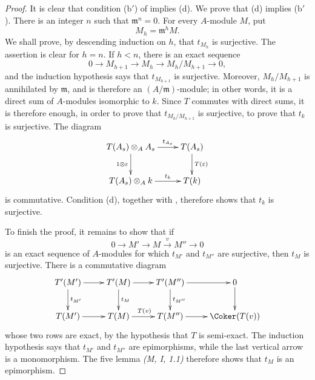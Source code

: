 \begin{proof}
It is clear that condition ($\mathrm{b}'$) of
 implies (d).  We prove that (d) implies
($\mathrm{b}'$).  There is an integer $n$ such that
$\mathfrak m^n=0$.  For every $A$-module $M$, put
\[
  M_h=\mathfrak m^hM.
\]
We shall prove, by descending induction on $h$, that $t_{M_h}$
is surjective.  The assertion is clear for $h=n$.  If $h<n$,
there is an exact sequence
\[
  0\longrightarrow M_{h+1}
  \longrightarrow M_h
  \longrightarrow M_h/M_{h+1}
  \longrightarrow0,
\]
and the induction hypothesis says that $t_{M_{h+1}}$ is
surjective.  Moreover, $M_h/M_{h+1}$ is annihilated by
$\mathfrak m$, and is therefore an $(A/\mathfrak m)$-module;
in other words, it is a direct sum of $A$-modules isomorphic to
$k$.  Since $T$ commutes with direct sums, it is therefore
enough, in order to prove that $t_{M_h/M_{h+1}}$ is surjective,
to prove that $t_k$ is surjective.  The diagram
\[
\xymatrix{
  T(A_s)\otimes_A A_s
    \ar[r]^-{t_{A_s}}\ar[d]_{1\otimes\varepsilon}
  & T(A_s)\ar[d]^{T(\varepsilon)}
  \\
  T(A_s)\otimes_A k
    \ar[r]^-{t_k}
  & T(k)
}
\]
is commutative.  Condition (d), together with
, therefore shows that $t_k$ is surjective.

To finish the proof, it remains to show that if
\[
  0\longrightarrow M'
  \longrightarrow M
  \xrightarrow{v}M''
  \longrightarrow0
\]
is an exact sequence of $A$-modules for which $t_{M'}$ and
$t_{M''}$ are surjective, then $t_M$ is surjective.  There is a
commutative diagram
\[
\xymatrix{
  T'(M')\ar[r]\ar[d]^{t_{M'}}
  & T'(M)\ar[r]\ar[d]^{t_M}
  & T'(M'')\ar[r]\ar[d]^{t_{M''}}
  & 0\ar[d]
  \\
  T(M')\ar[r]
  & T(M)\ar[r]^{T(v)}
  & T(M'')\ar[r]
  & \Coker(T(v))
}
\]
whose two rows are exact, by the hypothesis that $T$ is
semi-exact.  The induction hypothesis says that $t_{M'}$ and
$t_{M''}$ are epimorphisms, while the last vertical arrow is a
monomorphism.  The five lemma \emph{(M, I, 1.1)} therefore
shows that $t_M$ is an epimorphism.
\end{proof}
